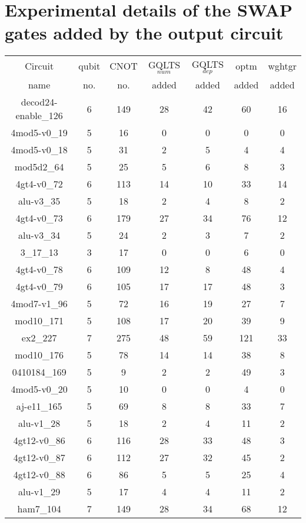\documentclass[runningheads]{llncs}
\begin{document}
\section{Experimental details of the SWAP gates added by the output circuit}
\begin{table}[H]
	\begin{center}  
	\begin{tabular}{|c|c|c|c|c|c|c|}
	\hline
	Circuit &  qubit  & CNOT &GQLTS$_{num}$& GQLTS$_{dep}$  & optm 	 & wghtgr 	\\
	 name	&   no. 	&	no. & added&  added &  added 	&  added\\
	\hline
	decod24-enable\_126 & 6 & 149 & 28 & 42 & 60 & 16 \\ 
4mod5-v0\_19 & 5 & 16 & 0 & 0 & 0 & 0 \\ 
4mod5-v0\_18 & 5 & 31 & 2 & 5 & 4 & 4 \\ 
mod5d2\_64 & 5 & 25 & 5 & 6 & 8 & 3 \\ 
4gt4-v0\_72 & 6 & 113 & 14 & 10 & 33 & 14 \\ 
alu-v3\_35 & 5 & 18 & 2 & 4 & 8 & 2 \\ 
4gt4-v0\_73 & 6 & 179 & 27 & 34 & 76 & 12 \\ 
alu-v3\_34 & 5 & 24 & 2 & 3 & 7 & 2 \\ 
3\_17\_13 & 3 & 17 & 0 & 0 & 6 & 0 \\ 
4gt4-v0\_78 & 6 & 109 & 12 & 8 & 48 & 4 \\ 
4gt4-v0\_79 & 6 & 105 & 17 & 17 & 48 & 3 \\ 
4mod7-v1\_96 & 5 & 72 & 16 & 19 & 27 & 7 \\ 
mod10\_171 & 5 & 108 & 17 & 20 & 39 & 9 \\ 
ex2\_227 & 7 & 275 & 48 & 59 & 121 & 33 \\ 
mod10\_176 & 5 & 78 & 14 & 14 & 38 & 8 \\ 
0410184\_169 & 5 & 9 & 2 & 2 & 49 & 3 \\ 
4mod5-v0\_20 & 5 & 10 & 0 & 0 & 4 & 0 \\ 
aj-e11\_165 & 5 & 69 & 8 & 8 & 33 & 7 \\ 
alu-v1\_28 & 5 & 18 & 2 & 4 & 11 & 2 \\ 
4gt12-v0\_86 & 6 & 116 & 28 & 33 & 48 & 3 \\ 
4gt12-v0\_87 & 6 & 112 & 27 & 32 & 45 & 2 \\ 
4gt12-v0\_88 & 6 & 86 & 5 & 5 & 25 & 4 \\ 
alu-v1\_29 & 5 & 17 & 4 & 4 & 11 & 2 \\ 
ham7\_104 & 7 & 149 & 28 & 34 & 68 & 12 \\ 

\end{tabular}
\end{center}
\end{table}
\end{document}
